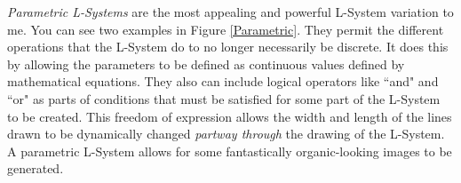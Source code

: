 \documentclass[12pt,twoside]{reedthesis}
\begin{document}
	
	\textit{Parametric L-Systems} are the most appealing and powerful L-System variation to me. You can see two examples in Figure \ref{Parametric}. They permit the different operations that the L-System do to no longer necessarily be discrete. It does this by allowing the parameters to be defined as continuous values defined by mathematical equations. They also can include logical operators like ``and" and ``or" as parts of conditions that must be satisfied for some part of the L-System to be created. This freedom of expression allows the width and length of the lines drawn to be dynamically changed \textit{partway through} the drawing of the L-System. A parametric L-System allows for some fantastically organic-looking images to be generated.\\
	
\end{document}
